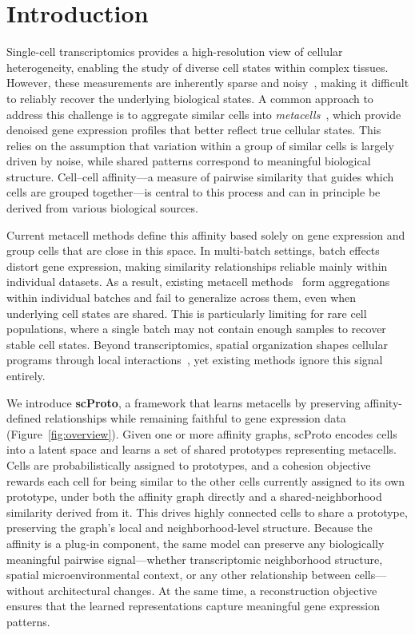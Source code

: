 \section{Introduction}

Single-cell transcriptomics provides a high-resolution view of cellular heterogeneity, enabling the study of diverse cell states within complex tissues. However, these measurements are inherently sparse and noisy~\citep{luecken2019current}, making it difficult to reliably recover the underlying biological states. A common approach to address this challenge is to aggregate similar cells into \emph{metacells}~\citep{metacell}, which provide denoised gene expression profiles that better reflect true cellular states. This relies on the assumption that variation within a group of similar cells is largely driven by noise, while shared patterns correspond to meaningful biological structure. Cell--cell affinity---a measure of pairwise similarity that guides which cells are grouped together---is central to this process and can in principle be derived from various biological sources.

Current metacell methods define this affinity based solely on gene expression and group cells that are close in this space. In multi-batch settings, batch effects distort gene expression, making similarity relationships reliable mainly within individual datasets. As a result, existing metacell methods~\citep{metacell, seacells, metacell2} form aggregations within individual batches and fail to generalize across them, even when underlying cell states are shared. This is particularly limiting for rare cell populations, where a single batch may not contain enough samples to recover stable cell states. Beyond transcriptomics, spatial organization shapes cellular programs through local interactions~\citep{nichenet, cellchat, mecell}, yet existing methods ignore this signal entirely.

We introduce \textbf{scProto}, a framework that learns metacells by preserving affinity-defined relationships while remaining faithful to gene expression data (Figure~\ref{fig:overview}). Given one or more affinity graphs, scProto encodes cells into a latent space and learns a set of shared prototypes representing metacells. Cells are probabilistically assigned to prototypes, and a cohesion objective rewards each cell for being similar to the other cells currently assigned to its own prototype, under both the affinity graph directly and a shared-neighborhood similarity derived from it. This drives highly connected cells to share a prototype, preserving the graph's local and neighborhood-level structure. Because the affinity is a plug-in component, the same model can preserve any biologically meaningful pairwise signal---whether transcriptomic neighborhood structure, spatial microenvironmental context, or any other relationship between cells---without architectural changes. At the same time, a reconstruction objective ensures that the learned representations capture meaningful gene expression patterns.

